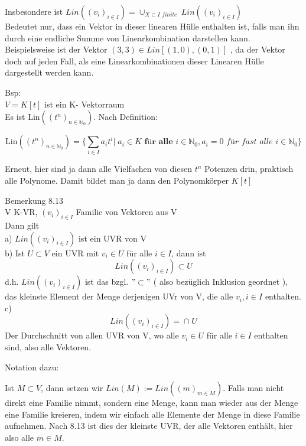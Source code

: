 \documentclass[headsepline,12pt,a4paper]{scrartcl}
\begin{document}
Insbesondere ist $\textit{Lin}((v_i)_{i \in I}) = \cup_{X \subset I \textit{ finite }} \textit{Lin}((v_i)_{i \in I}) $ \\

Bedeutet nur, dass ein Vektor in dieser linearen Hülle enthalten ist, falls man ihn durch eine endliche Summe von Linearkombination darstellen kann. Beispielsweise ist der Vektor $(3,3) \in \textit{Lin}[(1,0),(0,1)]$ , da der Vektor doch auf jeden Fall, als eine Linearkombinationen dieser Linearen Hülle dargestellt werden kann.\\

\item Bsp:\\
$V= K[t]$ ist ein K- Vektorraum \\

Es ist Lin$((t^n)_{n\in \mathbb{N}_0})$. Nach Definition:

$$\text{Lin}((t^n)_{n\in \mathbb{N}_0}) = \{\sum_{i \in I} a_i t^{i} | \; a_i \in K \textbf{ für alle } i \in \mathbb{N}_0, a_i = 0 \textit{ für fast alle } i \in \mathbb{N}_0 \} $$

Erneut, hier sind ja dann alle Vielfachen von diesen $t^n$ Potenzen drin, praktisch alle Polynome. Damit bildet man ja dann den Polynomkörper $K[t]$ \\

\newpage

\item Bemerkung 8.13 \\

V K-VR, $(v_i)_{i \in I}$ Familie von Vektoren aus V \\

Dann gilt \\
a) $\textit{Lin}((v_i)_{i \in I}) $ ist ein UVR von V \\
b) Ist $ U \subset V $ ein UVR mit $v_i \in U $ für alle $ i \in I $, dann ist $$ \textit{Lin}((v_i)_{i \in I}) \subset U $$
d.h. $\textit{Lin}((v_i)_{i \in I}) $ ist das bzgl. $ "\subset" $ ( also bezüglich Inklusion geordnet ), das kleinste Element der Menge derjenigen UVr von V, die alle $v_i, i \in I$ enthalten. \\
c) $$ \textit{Lin}((v_i)_{i \in I}) =  \cap_{} U $$ Der Durchschnitt von allen UVR von V, wo alle $v_i \in U$ für alle 
$ i \in I $ enthalten sind, also alle Vektoren. 

\item[Notation dazu:]

Ist $M \subset V$, dann setzen wir $Lin(M):=\textit{Lin}((m)_{m \in M}) $. Falls man nicht direkt eine Familie nimmt, sondern eine Menge, kann man wieder aus der Menge eine Familie kreieren, indem wir einfach alle Elemente der Menge in diese Familie aufnehmen. Nach 8.13 ist dies der kleinste UVR, der alle Vektoren enthält, hier also alle $m\in M$. \\
\end{document}

